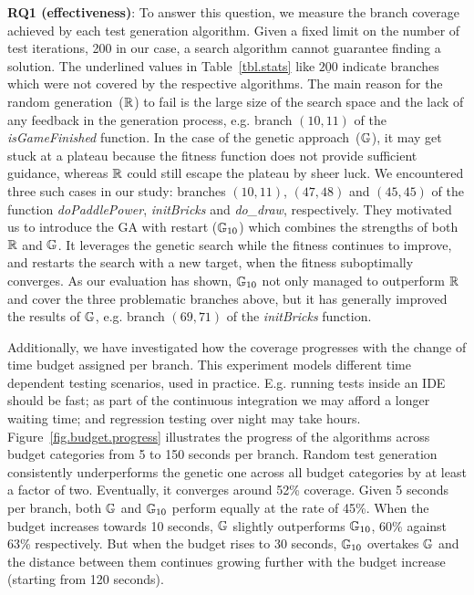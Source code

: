 \textbf{RQ1 (effectiveness)}: To answer this question, we measure the branch coverage achieved by each test generation algorithm. Given a fixed limit on the number of test iterations, 200 in our case, a search algorithm cannot guarantee finding a solution. The underlined values in Table~\ref{tbl.stats} like $\underline{200}$ indicate branches which were not covered by the respective algorithms. The main reason for the random generation~($\mathbb{R}$) to fail is the large size of the search space and the lack of any feedback in the generation process, e.g. branch $(10,11)$ of the \emph{isGameFinished} function. In the case of the genetic approach~($\mathbb{G}$), it  may get stuck at a plateau because the fitness function does not provide sufficient guidance, whereas $\mathbb{R}$ could still escape the plateau by sheer luck. We encountered three such cases in our study: branches $(10,11)$, $(47,48)$ and $(45,45)$ of the function \emph{doPaddlePower}, \emph{initBricks} and \emph{do_draw}, respectively. They motivated us to introduce the GA with restart ($\mathbb{G}_{10}$) which combines the strengths of both $\mathbb{R}$ and $\mathbb{G}$. It leverages the genetic search while the fitness continues to improve, and restarts the search with a new target, when the fitness suboptimally converges. As our evaluation has shown, $\mathbb{G}_{10}$ not only managed to outperform $\mathbb{R}$ and cover the three problematic branches above, but it has generally improved the results of $\mathbb{G}$, e.g. branch $(69,71)$ of the \emph{initBricks} function.\\

Additionally, we have investigated how the coverage progresses with the change of time budget assigned per branch. This experiment models different time dependent testing scenarios, used in practice. E.g. running tests inside an IDE should be fast; as part of the continuous integration we may afford a longer waiting time; and regression testing over night may take hours. Figure~\ref{fig.budget.progress} illustrates the progress of the algorithms across budget categories from 5 to 150 seconds per branch. Random test generation consistently underperforms the genetic one across all budget categories by at least a factor of two. Eventually, it converges around 52\% coverage. Given 5 seconds per branch, both $\mathbb{G}$ and $\mathbb{G}_{10}$ perform equally at the rate of 45\%. When the budget increases towards 10 seconds, $\mathbb{G}$ slightly outperforms $\mathbb{G}_{10}$, 60\% against 63\% respectively. But when the budget rises to 30 seconds, $\mathbb{G}_{10}$ overtakes $\mathbb{G}$ and the distance between them continues growing further with the budget increase (starting from 120 seconds).\\

